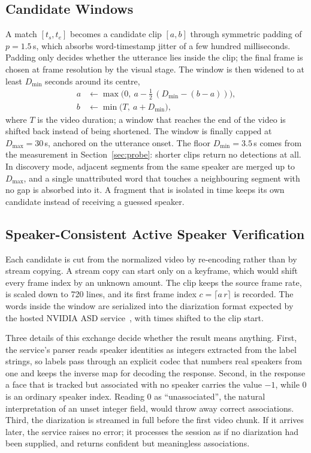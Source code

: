 \documentclass[conference]{IEEEtran}
\begin{document}
\subsection{Candidate Windows}
\label{sec:cand}
A match $[t_s,t_e]$ becomes a candidate clip $[a,b]$ through symmetric padding of $p=1.5$\,s, which absorbs word-timestamp jitter of a few hundred milliseconds. Padding only decides whether the utterance lies inside the clip; the final frame is chosen at frame resolution by the visual stage. The window is then widened to at least $D_{\min}$ seconds around its centre,
\begin{align}
a &\leftarrow \max\bigl(0,\ a-\tfrac{1}{2}\,(D_{\min}-(b-a))\bigr), \label{eq:floor}\\
b &\leftarrow \min\bigl(T,\ a+D_{\min}\bigr),
\end{align}
where $T$ is the video duration; a window that reaches the end of the video is shifted back instead of being shortened. The window is finally capped at $D_{\max}=30$\,s, anchored on the utterance onset. The floor $D_{\min}=3.5$\,s comes from the measurement in Section~\ref{sec:probe}: shorter clips return no detections at all. In discovery mode, adjacent segments from the same speaker are merged up to $D_{\max}$, and a single unattributed word that touches a neighbouring segment with no gap is absorbed into it. A fragment that is isolated in time keeps its own candidate instead of receiving a guessed speaker.

\subsection{Speaker-Consistent Active Speaker Verification}
Each candidate is cut from the normalized video by re-encoding rather than by stream copying. A stream copy can start only on a keyframe, which would shift every frame index by an unknown amount. The clip keeps the source frame rate, is scaled down to 720 lines, and its first frame index $c=\lceil a\,r\rceil$ is recorded. The words inside the window are serialized into the diarization format expected by the hosted NVIDIA ASD service~\cite{nvidia_asd}, with times shifted to the clip start.

Three details of this exchange decide whether the result means anything. First, the service's parser reads speaker identities as integers extracted from the label strings, so labels pass through an explicit codec that numbers real speakers from one and keeps the inverse map for decoding the response. Second, in the response a face that is tracked but associated with no speaker carries the value $-1$, while $0$ is an ordinary speaker index. Reading $0$ as ``unassociated'', the natural interpretation of an unset integer field, would throw away correct associations. Third, the diarization is streamed in full before the first video chunk. If it arrives later, the service raises no error; it processes the session as if no diarization had been supplied, and returns confident but meaningless associations.
\end{document}
